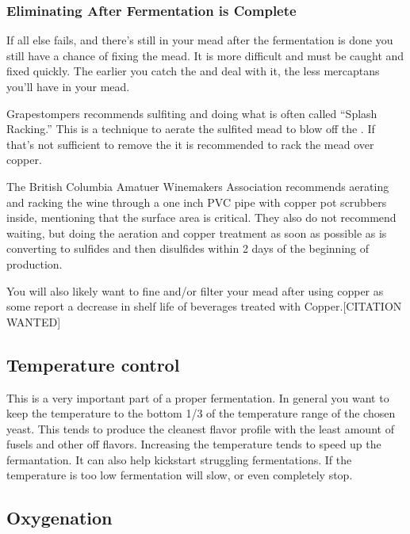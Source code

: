 \documentclass{article}
\begin{document}
  \subsubsection{Eliminating After Fermentation is Complete}
   If all else fails, and there's still  in your mead after the fermentation is done you still have a 
   chance of fixing the mead. It is more difficult and must be caught and fixed quickly. The earlier you catch 
   the  and deal with it, the less mercaptans you'll have in your mead. 

   Grapestompers\cite{grapestompers-H2S}
   recommends sulfiting and doing what is often called  ``Splash Racking.'' This is a technique to aerate the 
   sulfited mead to blow off the . If that's not sufficient to remove the  it is recommended 
   to rack the mead over copper. 

   The British Columbia Amatuer Winemakers Association\cite{bcawa-H2S} recommends
   aerating and racking the wine through a one inch PVC pipe with copper pot scrubbers inside, mentioning that 
   the surface area is critical. They also do not recommend waiting, but doing the aeration and copper treatment 
   as soon as possible as  is converting to sulfides and then disulfides within 2 days of the 
   beginning of  production.

   You will also likely want to fine and/or filter your mead after using copper as some report a decrease in 
   shelf life of beverages treated with Copper.[CITATION WANTED]

 \subsection{Temperature control}
  This is a very important part of a proper fermentation. In general you want to keep the temperature to the 
  bottom 1/3 of the temperature range of the chosen yeast. This tends to produce the cleanest flavor profile with 
  the least amount of fusels and other off flavors. Increasing the temperature tends to speed up the fermantation.
  It can also help kickstart struggling fermentations. If the temperature is too low fermentation will slow, or 
  even completely stop.

 \subsection{Oxygenation}
\end{document}
